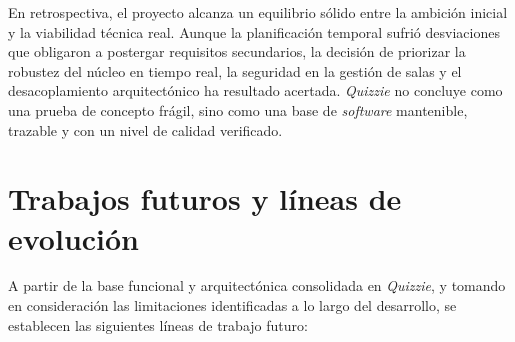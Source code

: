 En retrospectiva, el proyecto alcanza un equilibrio sólido entre la ambición inicial y la viabilidad técnica real. Aunque la planificación temporal sufrió desviaciones que obligaron a postergar requisitos secundarios, la decisión de priorizar la robustez del núcleo en tiempo real, la seguridad en la gestión de salas y el desacoplamiento arquitectónico ha resultado acertada. \textit{Quizzie} no concluye como una prueba de concepto frágil, sino como una base de \textit{software} mantenible, trazable y con un nivel de calidad verificado.

\section{Trabajos futuros y líneas de evolución}\label{sec:trabajo_futuro}

A partir de la base funcional y arquitectónica consolidada en \textit{Quizzie}, y tomando en consideración las limitaciones identificadas a lo largo del desarrollo, se establecen las siguientes líneas de trabajo futuro:


